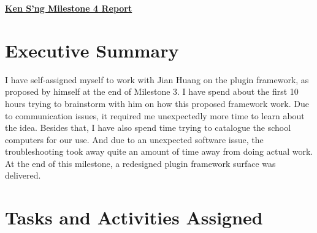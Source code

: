 \begin{center}
{\textbf{\underline{{Ken S'ng Milestone 4 Report}}}}
\end{center}

\section*{Executive Summary}

I have self-assigned myself to work with Jian Huang on the plugin framework, as proposed by himself at the end of Milestone 3. I have spend about the first 10 hours trying to brainstorm with him on how this proposed framework work. Due to communication issues, it required me unexpectedly more time to learn about the idea. Besides that, I have also spend time trying to catalogue the school computers for our use. And due to an unexpected software issue, the troubleshooting took away quite an amount of time away from doing actual work. At the end of this milestone, a redesigned plugin framework surface was delivered. 

\section*{Tasks and Activities Assigned}

